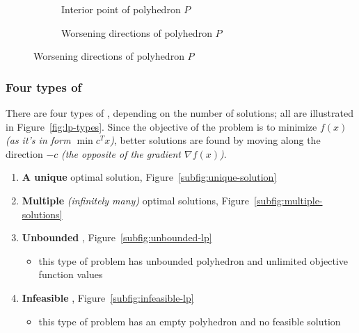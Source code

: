 \documentclass[english]{article}
\begin{document}
\begin{figure}[htbp]
  \bigskip
  \centering
  \begin{subfigure}[b]{0.495\textwidth}
    \bigskip
    \centering
    \caption{Interior point of polyhedron \(P\)}
    \label{subfig:interior-point-solution}
    \bigskip
  \end{subfigure}
  \begin{subfigure}[b]{0.495\textwidth}
    \bigskip
    \centering
    \caption{Worsening directions of polyhedron \(P\)}
    \label{subfig:worsening-point-direction}
    \bigskip
  \end{subfigure}
  \bigskip
\end{figure}

\subsubsection{Four types of \LP}

There are four types of \LP, depending on the number of solutions; all are illustrated in Figure~\ref{fig:lp-types}.
Since the objective of the problem is to minimize \(f(x)\) \textit{(as it's in form \(\min c^T x\))}, better solutions are found by moving along the direction \(-c\) \textit{(the opposite of the gradient \(\nabla f(x)\))}.

\begin{enumerate}
  \item \textbf{A unique} optimal solution, Figure~\ref{subfig:unique-solution}
  \item \textbf{Multiple} \textit{(infinitely many)} optimal solutions, Figure~\ref{subfig:multiple-solutions}
  \item \textbf{Unbounded} \LP, Figure~\ref{subfig:unbounded-lp}
        \begin{itemize}
          \item this type of problem has unbounded polyhedron and unlimited objective function values
        \end{itemize}
  \item \textbf{Infeasible} \LP, Figure~\ref{subfig:infeasible-lp}
        \begin{itemize}
          \item this type of problem has an empty polyhedron and no feasible solution
        \end{itemize}
\end{enumerate}
\end{document}
